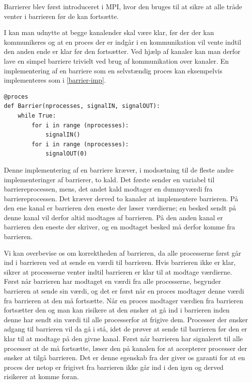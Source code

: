 Barrierer blev først introduceret i MPI, hvor den bruges til at 
sikre at alle tråde venter i barrieren før de kan fortsætte. 

I  kan man udnytte at begge 
kanalender skal være klar, før der der kan kommunikeres og at en proces der er 
indgår i en kommunikation vil vente indtil den anden ende er klar før den 
fortsætter.  Ved hjælp af kanaler kan man derfor lave en simpel barriere 
trivielt ved brug af kommunikation over kanaler.  En implementering af en 
barriere som en selvstændig proces kan eksempelvis implementeres som i 
\cref{barrier-imp}.

\begin{lstlisting}[float, label=barrier-imp,caption=En barriere i \pycsp]
@proces
def Barrier(nprocesses, signalIN, signalOUT):
	while True:
		for i in range (nprocesses):
			signalIN()
		for i in range (nprocesses):
			signalOUT(0)
\end{lstlisting}

Denne implementering af en barriere kræver, i modsætning til de fleste andre 
implementeringer af barrierer\cites{mpi-barrier, crew}, to kald. Det første 
sender en variabel til barriereprocessen, mens,
det andet kald modtager en dummyværdi fra barriereprocessen. Det kræver derved 
to kanaler at implementere barrieren. På den ene kanal er barrieren den eneste 
der læser værdierne; en besked sendt på denne kanal vil derfor altid modtages 
af barrieren. På den anden kanal er barrieren den eneste der skriver, og en 
modtaget besked må derfor komme fra barrieren.

Vi kan overbevise os om korrektheden af barrieren, da alle processerne først 
går ind i barrieren ved at sende en værdi til barrieren. Hvis barrieren ikke er 
klar, sikrer \csp at processerne venter indtil barrieren er klar til at modtage 
værdierne. Først når barrieren har modtaget en værdi fra alle processerne, 
begynder barrieren at sende sin værdi, og det er først når en proces modtager 
denne værdi fra barrieren at den må fortsætte. Når en proces modtager værdien 
fra barrieren fortsætter den og man kan risikere at den ønsker at gå ind i 
barrieren inden denne har sendt sin værdi til alle processerfor at frigive dem.
Processer der ønsker adgang til barrieren vil da gå i stå, idet de prøver at 
sende til barrieren før den er klar til at modtage på den givne kanal. Først 
når barrieren har signaleret til alle processer at de må fortsætte, læser den 
på kanalen for at accepterer processer der ønsker at tilgå barrieren. Det er 
denne egenskab fra \csp der giver os garanti for at en proces der netop er 
frigivet fra barrieren ikke går ind i den igen og derved risikerer at komme 
foran. 

